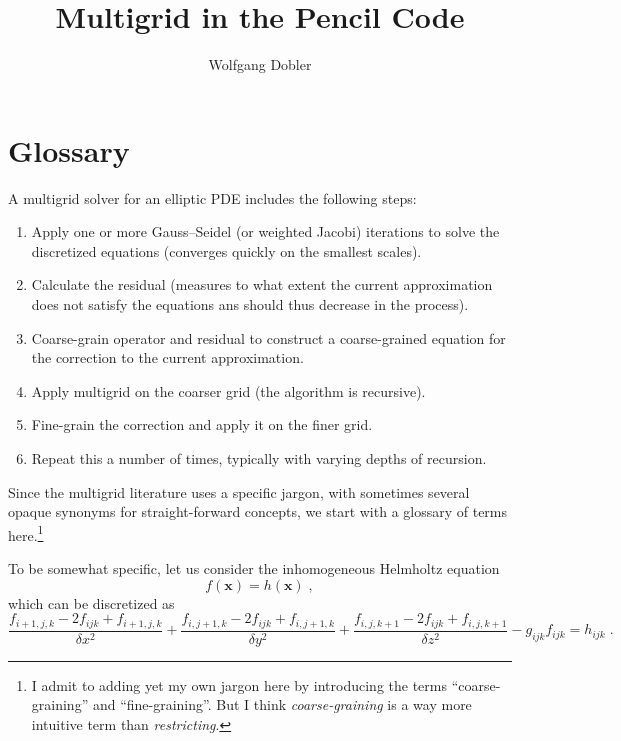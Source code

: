 \documentclass[\mydriver,12pt,twoside,notitlepage,letterpaper]{article}
\title{Multigrid in the Pencil Code}
\author{Wolfgang Dobler}
\newcommand{\xv}{\mathbf{x}}
\begin{document}
\thispagestyle{empty}

\maketitle

\tableofcontents

\section{Glossary}

A multigrid solver for an elliptic PDE includes the following steps:
\begin{enumerate}
\item Apply one or more Gauss--Seidel (or weighted Jacobi) iterations to
  solve the discretized equations (converges quickly on the smallest
  scales).
\item Calculate the residual (measures to what extent the current
  approximation does not satisfy the equations ans should thus decrease in
  the process).
\item Coarse-grain operator and residual to construct a coarse-grained
  equation for the correction to the current approximation.
\item Apply multigrid on the coarser grid (the algorithm is recursive).
\item Fine-grain the correction and apply it on the finer grid.
\item Repeat this a number of times, typically with varying depths of
  recursion.
\end{enumerate}

Since the multigrid literature uses a specific jargon, with sometimes
several opaque synonyms for straight-forward concepts, we start with a
glossary of terms here.\footnote{
  I admit to adding yet my own jargon here by introducing the terms
  ``coarse-graining'' and ``fine-graining''.
  But I think \emph{coarse-graining} is a way more intuitive term than
  \emph{restricting}.}

To be somewhat specific, let us consider the inhomogeneous Helmholtz
equation
\begin{equation}
  [\Delta - g(\xv)] f(\xv) = h(\xv) \; ,
\end{equation}
which can be discretized as
\begin{equation}
  \label{Eq-elliptic-discrete}
  \dfrac{f_{i{+}1,j,k} - 2 f_{ijk} + f_{i{+}1,j,k}}{\delta x^2}
  + \dfrac{f_{i,j{+}1,k} - 2 f_{ijk} + f_{i,j{+}1,k}}{\delta y^2}
  + \dfrac{f_{i,j,k{+}1} - 2 f_{ijk} + f_{i,j,k{+}1}}{\delta z^2}
  - g_{ijk} f_{ijk}
  = h_{ijk} \; .
\end{equation}
\end{document}
